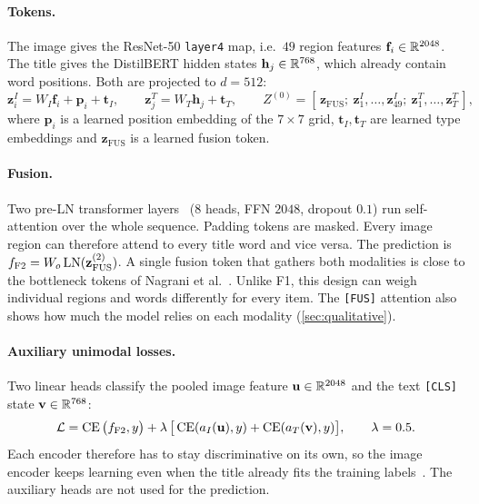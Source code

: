 \paragraph{Tokens.}
The image gives the ResNet-50 \texttt{layer4} map, i.e.\ $49$ region features $\mathbf{f}_i\in\mathbb{R}^{2048}$. The title
gives the DistilBERT hidden states $\mathbf{h}_j\in\mathbb{R}^{768}$, which already contain word positions. Both are projected
to $d=512$:
\begin{equation}
  \mathbf{z}^I_i = W_I\mathbf{f}_i + \mathbf{p}_i + \mathbf{t}_I, \qquad
  \mathbf{z}^T_j = W_T\mathbf{h}_j + \mathbf{t}_T, \qquad
  Z^{(0)} = [\,\mathbf{z}_{\mathrm{FUS}};\ \mathbf{z}^I_1,\dots,\mathbf{z}^I_{49};\ \mathbf{z}^T_1,\dots,\mathbf{z}^T_{T}\,],
\end{equation}
where $\mathbf{p}_i$ is a learned position embedding of the $7\times7$ grid, $\mathbf{t}_I,\mathbf{t}_T$ are learned
type embeddings and $\mathbf{z}_{\mathrm{FUS}}$ is a learned fusion token.

\paragraph{Fusion.}
Two pre-LN transformer layers~\cite{vaswani2017attention} ($8$ heads, FFN $2048$, dropout $0.1$) run self-attention
over the whole sequence. Padding tokens are masked. Every image region can therefore attend to every title word
and vice versa. The prediction is $f_{\mathrm{F2}} = W_o\operatorname{LN}(\mathbf{z}^{(2)}_{\mathrm{FUS}})$. A single fusion token
that gathers both modalities is close to the bottleneck tokens of Nagrani et al.~\cite{nagrani2021bottlenecks}.
Unlike F1, this design can weigh individual regions and words differently for every item. The \texttt{[FUS]}
attention also shows how much the model relies on each modality (\cref{sec:qualitative}).

\paragraph{Auxiliary unimodal losses.}
Two linear heads classify the pooled image feature $\mathbf{u}\in\mathbb{R}^{2048}$ and the text \texttt{[CLS]} state
$\mathbf{v}\in\mathbb{R}^{768}$:
\begin{equation}
  \label{eq:f2loss}
  \mathcal{L} = \operatorname{CE}\big(f_{\mathrm{F2}}, y\big) + \lambda\,\big[\operatorname{CE}(a_I(\mathbf{u}), y) + \operatorname{CE}(a_T(\mathbf{v}), y)\big],
  \qquad \lambda = 0.5 .
\end{equation}
Each encoder therefore has to stay discriminative on its own, so the image encoder keeps learning even when the
title already fits the training labels~\cite{wang2020makes}. The auxiliary heads are not used for the prediction.


